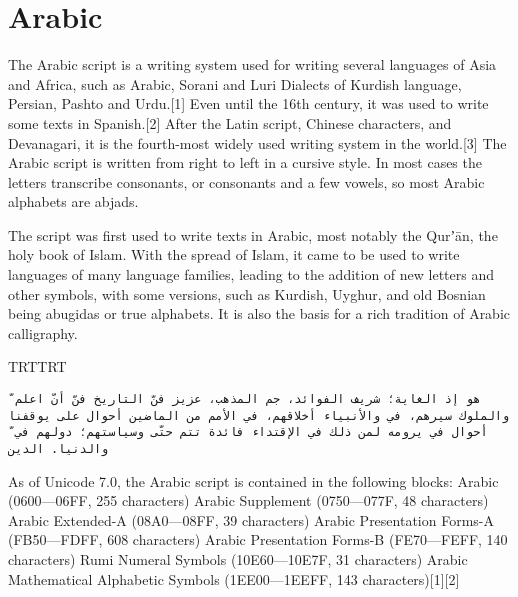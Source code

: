 \section{Arabic}

\newfontfamily{}         %
\newcommand{\textarabic}[1] %
           {\bgroup\luatextextdir TRT\arabian #1\egroup}
\newcommand{\narabic}         [1] %
           {\bgroup\luatextextdir TLT #1\egroup}
\newcommand{\afootnote} [1] %
           {\footnote{\textarabic{#1}}}
\newenvironment{Arabic}     %
           {\luatextextdir TRT\luatexpardir TRT\arabicfont}{}
The Arabic script is a writing system used for writing several languages of Asia and Africa, such as Arabic, Sorani and Luri Dialects of Kurdish language, Persian, Pashto and Urdu.[1] Even until the 16th century, it was used to write some texts in Spanish.[2] After the Latin script, Chinese characters, and Devanagari, it is the fourth-most widely used writing system in the world.[3]
The Arabic script is written from right to left in a cursive style. In most cases the letters transcribe consonants, or consonants and a few vowels, so most Arabic alphabets are abjads.

The script was first used to write texts in Arabic, most notably the Qurʼān, the holy book of Islam. With the spread of Islam, it came to be used to write languages of many language families, leading to the addition of new letters and other symbols, with some versions, such as Kurdish, Uyghur, and old Bosnian being abugidas or true alphabets. It is also the basis for a rich tradition of Arabic calligraphy.


\begin{Arabic}
\begin{verbatim}
ّ هو إذ الغاية؛ شريف الفوائد، جم المذهب، عزيز فنّ التاريخ فنّ أنّ اعلم
والملوك سيرهم، في والأنبياء أخلاقهم، في الأمم من الماضين أحوال على يوقفنا
ّ أحوال في يرومه لمن ذلك في الإقتداء فائدة تتم حتّى وسياستهم؛ دولهم في
والدنيا. الدين

\end{verbatim}
\end{Arabic}





As of Unicode 7.0, the Arabic script is contained in the following blocks:
Arabic (0600—06FF, 255 characters)
Arabic Supplement (0750—077F, 48 characters)
Arabic Extended-A (08A0—08FF, 39 characters)
Arabic Presentation Forms-A (FB50—FDFF, 608 characters)
Arabic Presentation Forms-B (FE70—FEFF, 140 characters)
Rumi Numeral Symbols (10E60—10E7F, 31 characters)
Arabic Mathematical Alphabetic Symbols (1EE00—1EEFF, 143 characters)[1][2]

